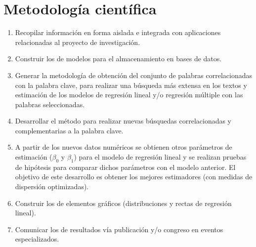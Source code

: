 \section {Metodología científica}
\begin{enumerate}
\item Recopilar información en forma aislada e integrada con aplicaciones relacionadas al proyecto de investigación.
\item Construir los de modelos para el almacenamiento en bases de datos.
\item Generar la metodología de obtención del conjunto de palabras correlacionadas con la palabra clave, para realizar una búsqueda más extensa en los textos y estimación de los modelos de regresión lineal y/o regresión múltiple con las palabras seleccionadas.
\item Desarrollar el método para realizar nuevas búsquedas correlacionadas y complementarias a la palabra clave.
\item A partir de los nuevos datos numéricos se obtienen otros parámetros de estimación ($\beta_0$ y $\beta_1$) para el modelo de regresión lineal y se realizan pruebas de hipótesis para comparar dichos parámetros con el modelo anterior. El objetivo de este desarrollo es obtener los mejores estimadores (con medidas de dispersión optimizadas).
\item Construir los de elementos gráficos (distribuciones y rectas de regresión lineal).
\item Comunicar los de resultados vía publicación y/o congreso en eventos especializados.
\end{enumerate}